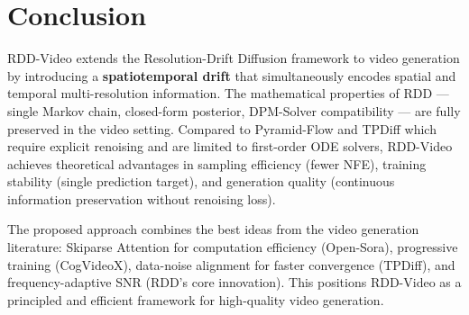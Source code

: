 \documentclass[11pt,a4paper]{article}
\begin{document}
\section{Conclusion}

RDD-Video extends the Resolution-Drift Diffusion framework to video generation by introducing a \textbf{spatiotemporal drift} that simultaneously encodes spatial and temporal multi-resolution information. The mathematical properties of RDD --- single Markov chain, closed-form posterior, DPM-Solver compatibility --- are fully preserved in the video setting. Compared to Pyramid-Flow and TPDiff which require explicit renoising and are limited to first-order ODE solvers, RDD-Video achieves theoretical advantages in sampling efficiency (fewer NFE), training stability (single prediction target), and generation quality (continuous information preservation without renoising loss).

The proposed approach combines the best ideas from the video generation literature: Skiparse Attention for computation efficiency (Open-Sora), progressive training (CogVideoX), data-noise alignment for faster convergence (TPDiff), and frequency-adaptive SNR (RDD's core innovation). This positions RDD-Video as a principled and efficient framework for high-quality video generation.
\end{document}
